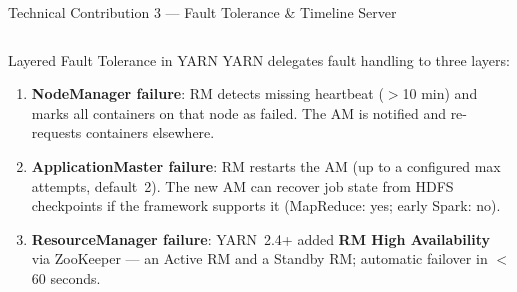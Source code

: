 \documentclass[aspectratio=169,10pt]{beamer}
\begin{document}
\begin{frame}{Technical Contribution 3 — Fault Tolerance \& Timeline Server}
  \begin{columns}[T]
      \begin{block}{Layered Fault Tolerance in YARN}
        YARN delegates fault handling to three layers:
        \begin{enumerate}
          \item \textbf{NodeManager failure}: RM detects missing
                heartbeat ($>$10 min) and marks all containers on
                that node as failed.  The AM is notified and
                re-requests containers elsewhere.
          \item \textbf{ApplicationMaster failure}: RM restarts the AM
                (up to a configured max attempts, default~2).
                The new AM can recover job state from HDFS
                checkpoints if the framework supports it
                (MapReduce: yes; early Spark: no).
          \item \textbf{ResourceManager failure}: YARN~2.4+ added
                \textbf{RM High Availability} via ZooKeeper —
                an Active RM and a Standby RM; automatic failover
                in $<$60 seconds.
        \end{enumerate}
      \end{block}


\end{columns}
\end{frame}
\end{document}
